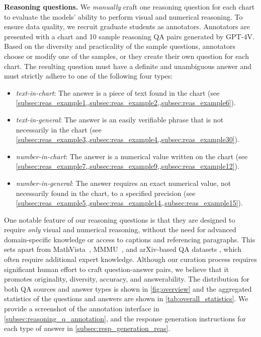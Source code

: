 \textbf{Reasoning questions.  }
We \textit{manually} craft one reasoning question for each chart to evaluate the models' ability to perform visual and numerical reasoning. 
To ensure data quality, we recruit graduate students as annotators. 
Annotators are presented with a chart and 10 sample reasoning QA pairs generated by GPT-4V. 
Based on the diversity and practicality of the sample questions, annotators choose or modify one of the samples, or they create their own question for each chart.
The resulting question must have a definite and unambiguous answer and must strictly adhere to one of the following four types:
\vspace{-2ex}
\begin{itemize}[leftmargin=*]
  \setlength\itemsep{-0.2em}
  \item \textit{text-in-chart}: The answer is a piece of text found in the chart (see \cref{subsec:reas_example1,,subsec:reas_example2,,subsec:reas_example6}).
  \item \textit{text-in-general}: The answer is an easily verifiable phrase that is not necessarily in the chart (see \cref{subsec:reas_example3,,subsec:reas_example4,,subsec:reas_example30}).
  \item \textit{number-in-chart}: The answer is a numerical value written on the chart (see \cref{subsec:reas_example7,,subsec:reas_example9,,subsec:reas_example12}).
  \item \textit{number-in-general}: The answer requires an exact numerical value, not necessarily found in the chart, to a specified precision (see \cref{subsec:reas_example5,,subsec:reas_example14,,subsec:reas_example15}). 
\end{itemize}
\vspace{-2ex}

One notable feature of our reasoning questions is that they are designed to require \textit{only} visual and numerical reasoning, without the need for advanced domain-specific knowledge or access to captions and referencing paragraphs. 
This sets {\ours{}} apart from MathVista~\cite{lu2024mathvista}, MMMU~\cite{yue2023mmmu}, and arXiv-based QA datasets \cite{liu2024mmc, li2023scigraphqa, li2024multimodal}, which often require additional expert knowledge.
Although our curation process requires significant human effort to craft question-answer pairs, we believe that it promotes originality, diversity, accuracy, and answerability. 
The distribution for both QA sources and answer types is shown in \cref{fig:overview} and the aggregated statistics of the questions and answers are shown in \cref{tab:overall_statistics}. 
We provide a screenshot of the annotation interface in \cref{subsec:reasoning_q_annotation}, and the response generation instructions for each type of answer in \cref{subsec:resp_generation_reas}. 

